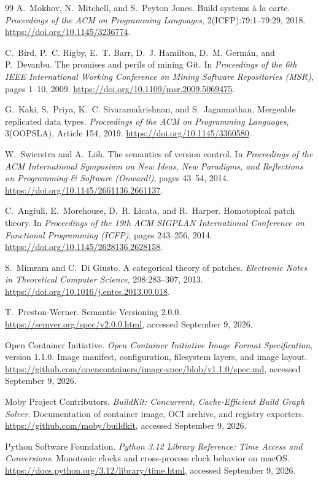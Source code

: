 \begin{thebibliography}{99}
A.~Mokhov, N.~Mitchell, and S.~Peyton Jones.
Build systems \`a la carte.
\emph{Proceedings of the ACM on Programming Languages},
2(ICFP):79:1--79:29, 2018.
\url{https://doi.org/10.1145/3236774}.

C.~Bird, P.~C. Rigby, E.~T. Barr, D.~J. Hamilton, D.~M. Germ\'an, and
P.~Devanbu.
The promises and perils of mining Git.
In \emph{Proceedings of the 6th IEEE International Working Conference
on Mining Software Repositories (MSR)}, pages 1--10, 2009.
\url{https://doi.org/10.1109/msr.2009.5069475}.

G.~Kaki, S.~Priya, K.~C. Sivaramakrishnan, and S.~Jagannathan.
Mergeable replicated data types.
\emph{Proceedings of the ACM on Programming Languages},
3(OOPSLA), Article 154, 2019.
\url{https://doi.org/10.1145/3360580}.

W.~Swierstra and A.~L\"oh.
The semantics of version control.
In \emph{Proceedings of the ACM International Symposium on New Ideas,
New Paradigms, and Reflections on Programming \& Software (Onward!)},
pages 43--54, 2014.
\url{https://doi.org/10.1145/2661136.2661137}.

C.~Angiuli, E.~Morehouse, D.~R. Licata, and R.~Harper.
Homotopical patch theory.
In \emph{Proceedings of the 19th ACM SIGPLAN International Conference
on Functional Programming (ICFP)}, pages 243--256, 2014.
\url{https://doi.org/10.1145/2628136.2628158}.

S.~Mimram and C.~Di Giusto.
A categorical theory of patches.
\emph{Electronic Notes in Theoretical Computer Science}, 298:283--307, 2013.
\url{https://doi.org/10.1016/j.entcs.2013.09.018}.

T.~Preston-Werner.
Semantic Versioning 2.0.0.
\url{https://semver.org/spec/v2.0.0.html}, accessed September 9, 2026.

Open Container Initiative.
\emph{Open Container Initiative Image Format Specification}, version 1.1.0.
Image manifest, configuration, filesystem layers, and image layout.
\url{https://github.com/opencontainers/image-spec/blob/v1.1.0/spec.md},
accessed September 9, 2026.

Moby Project Contributors.
\emph{BuildKit: Concurrent, Cache-Efficient Build Graph Solver}.
Documentation of container image, OCI archive, and registry exporters.
\url{https://github.com/moby/buildkit}, accessed September 9, 2026.

Python Software Foundation.
\emph{Python 3.12 Library Reference: Time Access and Conversions}.
Monotonic clocks and cross-process clock behavior on macOS.
\url{https://docs.python.org/3.12/library/time.html}, accessed September 9, 2026.


\end{thebibliography}
